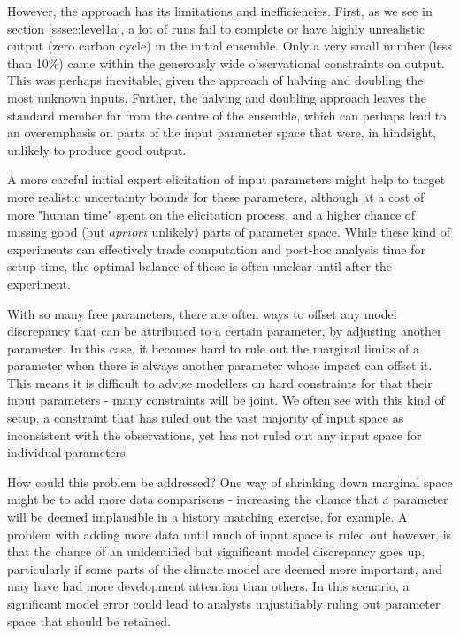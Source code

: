 \documentclass[gmd, manuscript]{copernicus}
\begin{document}
However, the approach has its limitations and inefficiencies. First, as we see in section \ref{sssec:level1a}, a lot of runs fail to complete or have highly unrealistic output (zero carbon cycle) in the initial ensemble. Only a very small number (less than 10\%) came within the generously wide observational constraints on output.  This was perhaps inevitable, given the approach of halving and doubling the most unknown inputs. Further, the halving and doubling approach leaves the standard member far from the centre of the ensemble, which can perhaps lead to an overemphasis on parts of the input parameter space that were, in hindsight, unlikely to produce good output.

A more careful initial expert elicitation of input parameters might help to target more realistic uncertainty bounds for these parameters, although at a cost of more "human time" spent on the elicitation process, and a higher chance of missing good (but $a priori$ unlikely) parts of parameter space. While these kind of experiments can effectively trade computation and post-hoc analysis time for setup time, the optimal balance of these is often unclear until after the experiment.

With so many free parameters, there are often ways to offset any model discrepancy that can be attributed to a certain parameter, by adjusting another parameter. In this case, it becomes hard to rule out the marginal limits of a parameter when there is always another parameter whose impact can offset it. This means it is difficult to advise modellers on hard constraints for that their input parameters - many constraints will be joint. We often see with this kind of setup, a constraint that has ruled out the vast majority of input space as inconsistent with the observations, yet has not ruled out any input space for individual parameters.

How could this problem be addressed? One way of shrinking down marginal space might be to add more data comparisons - increasing the chance that a parameter will be deemed implausible in a history matching exercise, for example. A problem with adding more data until much of input space is ruled out however, is that the chance of an unidentified but significant model discrepancy goes up, particularly if some parts of the climate model are deemed more important, and may have had more development attention than others. In this scenario, a significant model error could lead to analysts unjustifiably ruling out parameter space that should be retained.
\end{document}

